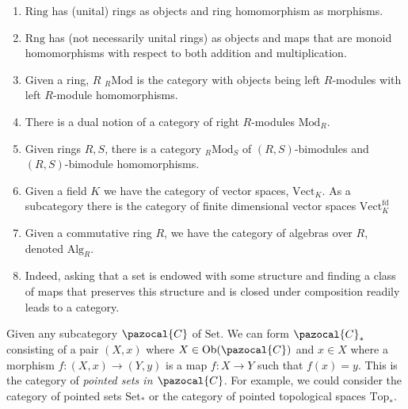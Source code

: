 \begin{example}
\begin{enumerate}
        \item $\mathrm{Ring}$ has (unital) rings as objects and ring homomorphism as morphisms. 
        \item $\mathrm{Rng}$ has (not necessarily unital rings) as objects and maps that are monoid homomorphisms with respect to both addition and multiplication. 
        \item Given a ring, $R$ $_R\mathrm{Mod}$ is the category with objects being left $R$-modules with left $R$-module homomorphisms.
        \item There is a dual notion of a category of right $R$-modules $\mathrm{Mod}_R$. 
        \item Given rings $R,S$, there is a category $_R\mathrm{Mod}_S$ of $(R,S)$-bimodules and $(R,S)$-bimodule homomorphisms. 
        \item Given a field $K$ we have the category of vector spaces, $\mathrm{Vect}_K$. As a subcategory there is the category of finite dimensional vector spaces $\mathrm{Vect}_K^\mathrm{fd}$
        \item Given a commutative ring $R$, we have the category of algebras over $R$, denoted $\mathrm{Alg}_R$. 
        \item Indeed, asking that a set is endowed with some structure and finding a class of maps that preserves this structure and is closed under composition readily leads to a category. 
    \end{enumerate}
\end{example}
\begin{example}
    Given any subcategory $\pazocal{C}$ of $\mathrm{Set}$. We can form $\pazocal{C}_\ast$ consisting of a pair $(X,x)$ where $X\in \Ob(\pazocal{C})$ and $x\in X$ where a morphism $f: (X,x)\rightarrow (Y,y)$ is a map $f:X\rightarrow Y$ such that $f(x)=y$. This is the category of \emph{pointed sets in $\pazocal{C}$}. For example, we could consider the category of pointed sets $\mathrm{Set}_\ast$ or the category of pointed topological spaces $\mathrm{Top}_\ast$.
\end{example}
